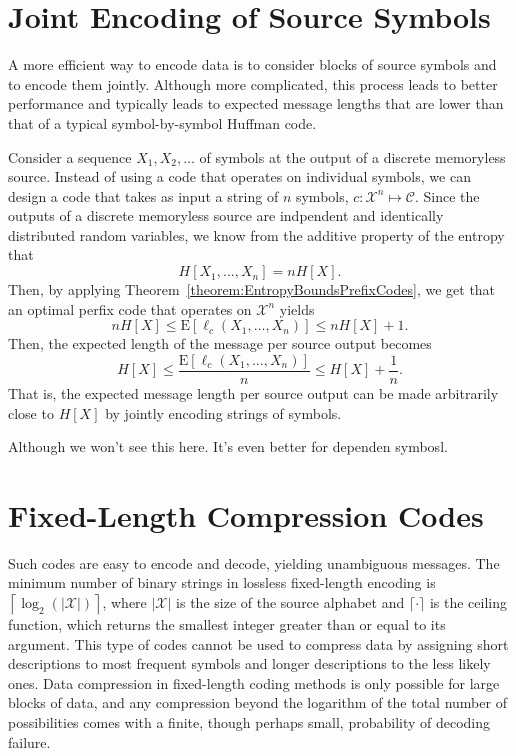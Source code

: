 \section{Joint Encoding of Source Symbols}

A more efficient way to encode data is to consider blocks of source symbols and to encode them jointly.
Although more complicated, this process leads to better performance and typically leads to expected message lengths that are lower than that of a typical symbol-by-symbol Huffman code.

Consider a sequence $X_1, X_2, \ldots$ of symbols at the output of a discrete memoryless source.
Instead of using a code that operates on individual symbols, we can design a code that takes as input a string of $n$ symbols, $c: \mathcal{X}^n \mapsto \mathcal{C}$.
Since the outputs of a discrete memoryless source are indpendent and identically distributed random variables, we know from the additive property of the entropy that
\begin{equation*}
H[X_1, \ldots, X_n ] = n H [X] .
\end{equation*}
Then, by applying Theorem~\ref{theorem:EntropyBoundsPrefixCodes}, we get that an optimal perfix code that operates on $\mathcal{X}^n$ yields
\begin{equation*}
n H[X] \leq \mathrm{E} [ \ell_c (X_1, \ldots, X_n) ] \leq n H[X] + 1.
\end{equation*}
Then, the expected length of the message per source output becomes
\begin{equation*}
H[X] \leq \frac{ \mathrm{E} [ \ell_c (X_1, \ldots, X_n) ] }{n} \leq H[X] + \frac{1}{n} .
\end{equation*}
That is, the expected message length per source output can be made arbitrarily close to $H[X]$ by jointly encoding strings of symbols.


Although we won't see this here.  It's even better for dependen symbosl.


\section{Fixed-Length Compression Codes}

Such codes are easy to encode and decode, yielding unambiguous messages.
The minimum number of binary strings in lossless fixed-length encoding is $\left\lceil \log_2 ( | \mathcal{X} | ) \right\rceil$, where $| \mathcal{X} |$ is the size of the source alphabet and $\lceil \cdot \rceil$ is the ceiling function, which returns the smallest integer greater than or equal to its argument.
This type of codes cannot be used to compress data by assigning short descriptions to most frequent symbols and longer descriptions to the less likely ones.
Data compression in fixed-length coding methods is only possible for large blocks of data, and any compression beyond the logarithm of the total number of possibilities comes with a finite, though perhaps small, probability of decoding failure.


